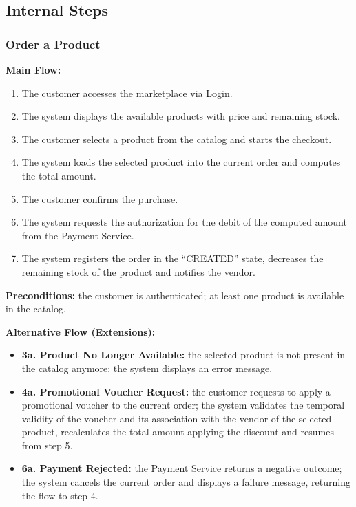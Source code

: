 \subsection{Internal Steps}
\label{subsec:uc_internal_steps}
\clearpage

\subsubsection{Order a Product}
\label{u:uc04}

\textbf{Main Flow:}
\begin{enumerate}
    \item The customer accesses the marketplace via Login.
    \item The system displays the available products with price and remaining stock.
    \item The customer selects a product from the catalog and starts the checkout.
    \item The system loads the selected product into the current order and computes the total amount.
    \item The customer confirms the purchase.
    \item The system requests the authorization for the debit of the computed amount from the Payment Service.
    \item The system registers the order in the ``CREATED'' state, decreases the remaining stock of the product and notifies the vendor.
\end{enumerate}

\textbf{Preconditions:} the customer is authenticated; at least one product is available in the catalog.

\textbf{Alternative Flow (Extensions):}
\begin{itemize}
    \item \textbf{3a. Product No Longer Available:} the selected product is not present in the catalog anymore; the system displays an error message.
    \item \textbf{4a. Promotional Voucher Request:} the customer requests to apply a promotional voucher to the current order; the system validates the temporal validity of the voucher and its association with the vendor of the selected product, recalculates the total amount applying the discount and resumes from step 5.
    \item \textbf{6a. Payment Rejected:} the Payment Service returns a negative outcome; the system cancels the current order and displays a failure message, returning the flow to step 4.
\end{itemize}
